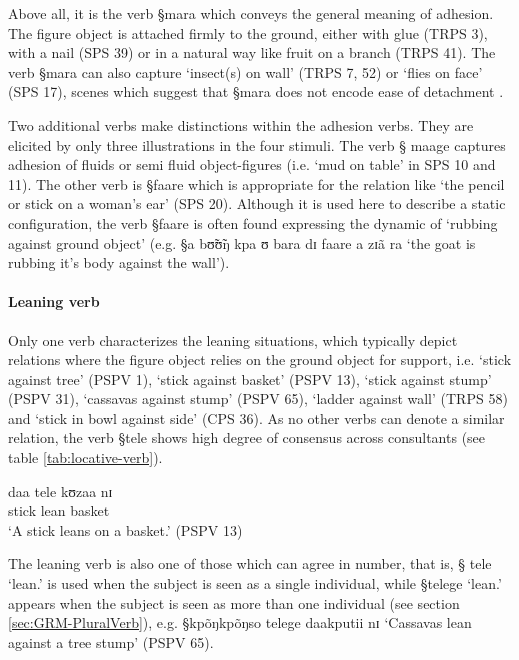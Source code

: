 Above all, it is the verb {\S mara} which conveys the general meaning of
adhesion. The figure object is attached firmly to the ground,
either with glue (TRPS 3), with a nail (SPS 39) or in a natural way like 
fruit on a branch (TRPS 41). The verb {\S mara} can also capture 
`insect(s) on wall' (TRPS 7, 52)  or `flies on face' (SPS 17), scenes which
suggest that  {\S mara} does not encode ease of detachment
\cite[1098]{Amek07}. 

Two additional verbs make distinctions within the adhesion verbs. They are 
elicited by only three illustrations in the four stimuli. The verb {\S
maage} captures adhesion  of fluids or semi fluid object-figures (i.e. `mud on
table' in SPS 10 and 11).  The other verb is {\S faare} which is appropriate for
the relation like `the pencil or stick on a
woman’s ear' (SPS 20). Although it is used here to describe a static
configuration, the verb {\S faare} is often found expressing the dynamic of 
`rubbing against ground object'  (e.g. {\S a 
bʊ̃ʊ̃ŋ kpa ʊ bara dɪ faare a zɪã ra} `the goat is rubbing it's body against the
wall').


\paragraph{Leaning verb}
\label{sec:SPA-leaning-v}

Only one verb characterizes the leaning situations,  which  typically depict
relations where the figure object  relies on the ground object for support, i.e.
  `stick against tree' (PSPV 1),  `stick against basket'  (PSPV 13),   `stick
against stump'  (PSPV 31),   `cassavas against stump' (PSPV 65),  `ladder
against wall' (TRPS 58) and  `stick in bowl against side'  (CPS 36). As no other
verbs can denote a similar relation, the verb {\S tele} shows high degree of
consensus across consultants (see table \ref{tab:locative-verb}). 


\begin{exe}
  \ex\label{ex:adhere-v-PSPV-13}
\gll  daa tele kʊzaa nɪ \\
stick lean basket {\postp}\\
\glt `A stick leans on a basket.' (PSPV 13)
\end{exe}

The leaning verb is also one of those which can agree in number, that is,  {\S
tele} `lean.{\sg}'  is used when the subject is seen as a single individual,
while {\S telege} `lean.{\pl}' appears when the subject is seen as more than one
individual  (see section \ref{sec:GRM-PluralVerb}), e.g. {\S kpõŋkpõŋso telege
daakputii nɪ} `Cassavas lean against a tree stump' (PSPV 65).


